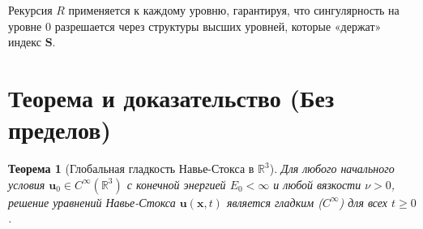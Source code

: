 \documentclass[12pt]{article}
\newtheorem{theorem}{Теорема}
\newcommand{\R}{\mathbb{R}}
\newcommand{\0}{\mathbf{0}}
\newcommand{\1}{\mathds{1}}
\newcommand{\bu}{\mathbf{u}}
\newcommand{\bx}{\mathbf{x}}
\newcommand{\bS}{\mathbf{S}}
\begin{document}
Рекурсия $R$ применяется к каждому уровню, гарантируя, что сингулярность на уровне 0 разрешается через структуры высших уровней, которые «держат» индекс $\bS$.

\section{Теорема и доказательство (Без пределов)}

\begin{theorem}[Глобальная гладкость Навье-Стокса в $\R^3$]
Для любого начального условия $\bu_0 \in C^{\infty}(\R^3)$ с конечной энергией $E_0 < \infty$ и любой вязкости $\nu > 0$, решение уравнений Навье-Стокса $\bu(\bx,t)$ является гладким ($C^{\infty}$) для всех $t \geq 0$.
\end{theorem}
\end{document}
